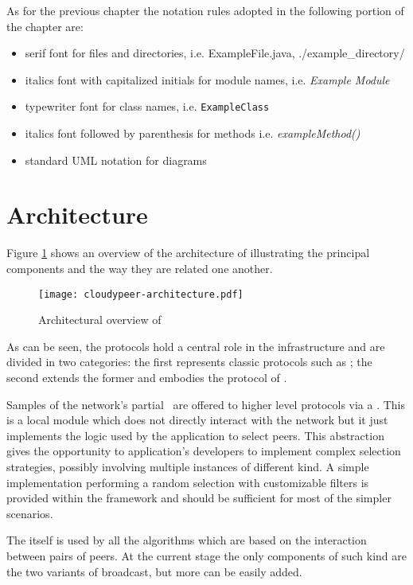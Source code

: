 As for the previous chapter the notation rules adopted in the
following portion of the chapter are:
\begin{itemize}
  \item serif font for files and directories, i.e. \textsf{ExampleFile.java},
    \textsf{./example\_directory/}
  \item italics font with capitalized initials for module names,
    i.e. \textit{Example Module}
 \item typewriter font for class names, i.e. \texttt{ExampleClass}
  \item italics font followed by parenthesis for methods
    i.e. \textit{exampleMethod()}
  \item standard UML notation for diagrams
\end{itemize}

\section{Architecture}
Figure \ref{fig:cloudypeer-architecture} shows an overview of the
architecture of \cloudypeer illustrating the principal components and
the way they are related one another.

\begin{figure}[h!]
  \centering
  \texttt{[image: cloudypeer-architecture.pdf]}
  \caption{Architectural overview of \cloudypeer}
  \label{fig:cloudypeer-architecture}
\end{figure}

As can be seen, the \peersampling protocols hold a central role in the
infrastructure and are divided in two categories: the first represents
classic protocols such as \cyclon; the second extends the former and
embodies the \peersampling protocol of \cloudcast.

Samples of the network's partial \view\ are offered to higher level
protocols via a \peerselector. This is a local module which does not
directly interact with the \ptop network but it just implements the logic
used by the application to select peers. This abstraction gives the
opportunity to application's developers to implement complex selection
strategies, possibly involving multiple \peersampling instances of
different kind. A simple implementation performing a random
selection with customizable filters is provided within the framework
and should be sufficient for most of the simpler scenarios.

The \peerselector itself is used by all the algorithms which are
based on the interaction between pairs of peers. At the current stage
the only components of such kind are the two variants of \epidemic
broadcast, but more can be easily added.

